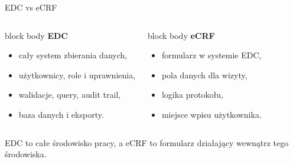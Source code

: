\begin{frame}{EDC vs eCRF}
  \begin{columns}[T,onlytextwidth]
    \begin{beamercolorbox}[wd=\linewidth,sep=0.8em,rounded=true]{block body}
      \textbf{\textcolor{UAFMTeal}{EDC}} \par\medskip
      \begin{itemize}
        \item cały system zbierania danych,
        \item użytkownicy, role i uprawnienia,
        \item walidacje, query, audit trail,
        \item baza danych i eksporty.
      \end{itemize}
    \end{beamercolorbox}

    \begin{beamercolorbox}[wd=\linewidth,sep=0.8em,rounded=true]{block body}
      \textbf{\textcolor{UAFMOrange}{eCRF}} \par\medskip
      \begin{itemize}
        \item formularz w systemie EDC,
        \item pola danych dla wizyty,
        \item logika protokołu,
        \item miejsce wpisu użytkownika.
      \end{itemize}
    \end{beamercolorbox}
  \end{columns}

  \vspace{0.35cm}

  \begin{ExampleBox}
    EDC to całe środowisko pracy, a eCRF to formularz działający wewnątrz tego środowiska.
  \end{ExampleBox}
\end{frame}

